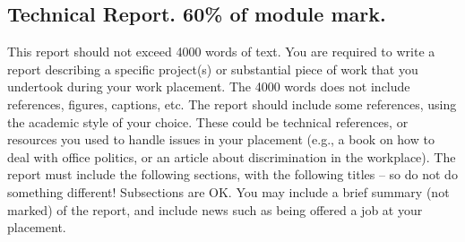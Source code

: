 \documentclass[11pt]{article}
\begin{document}
\subsection{Technical Report. 60\% of module mark.}
\label{sec:orgb9a001a}
This report should not exceed 4000 words of text. You are required to write a report
describing a specific project(s) or substantial piece of work that you undertook during your
work placement. The 4000 words does not include references, figures, captions, etc. The
report should include some references, using the academic style of your choice. These could
be technical references, or resources you used to handle issues in your placement (e.g., a
book on how to deal with office politics, or an article about discrimination in the workplace).
The report must include the following sections, with the following titles – so do not do
something different! Subsections are OK. You may include a brief summary (not marked) of
the report, and include news such as being offered a job at your placement.
\end{document}

